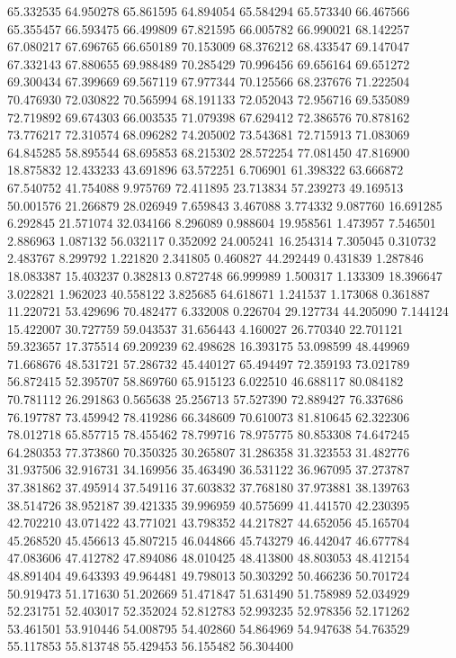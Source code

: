 65.332535
64.950278
65.861595
64.894054
65.584294
65.573340
66.467566
65.355457
66.593475
66.499809
67.821595
66.005782
66.990021
68.142257
67.080217
67.696765
66.650189
70.153009
68.376212
68.433547
69.147047
67.332143
67.880655
69.988489
70.285429
70.996456
69.656164
69.651272
69.300434
67.399669
69.567119
67.977344
70.125566
68.237676
71.222504
70.476930
72.030822
70.565994
68.191133
72.052043
72.956716
69.535089
72.719892
69.674303
66.003535
71.079398
67.629412
72.386576
70.878162
73.776217
72.310574
68.096282
74.205002
73.543681
72.715913
71.083069
64.845285
58.895544
68.695853
68.215302
28.572254
77.081450
47.816900
18.875832
12.433233
43.691896
63.572251
6.706901
61.398322
63.666872
67.540752
41.754088
9.975769
72.411895
23.713834
57.239273
49.169513
50.001576
21.266879
28.026949
7.659843
3.467088
3.774332
9.087760
16.691285
6.292845
21.571074
32.034166
8.296089
0.988604
19.958561
1.473957
7.546501
2.886963
1.087132
56.032117
0.352092
24.005241
16.254314
7.305045
0.310732
2.483767
8.299792
1.221820
2.341805
0.460827
44.292449
0.431839
1.287846
18.083387
15.403237
0.382813
0.872748
66.999989
1.500317
1.133309
18.396647
3.022821
1.962023
40.558122
3.825685
64.618671
1.241537
1.173068
0.361887
11.220721
53.429696
70.482477
6.332008
0.226704
29.127734
44.205090
7.144124
15.422007
30.727759
59.043537
31.656443
4.160027
26.770340
22.701121
59.323657
17.375514
69.209239
62.498628
16.393175
53.098599
48.449969
71.668676
48.531721
57.286732
45.440127
65.494497
72.359193
73.021789
56.872415
52.395707
58.869760
65.915123
6.022510
46.688117
80.084182
70.781112
26.291863
0.565638
25.256713
57.527390
72.889427
76.337686
76.197787
73.459942
78.419286
66.348609
70.610073
81.810645
62.322306
78.012718
65.857715
78.455462
78.799716
78.975775
80.853308
74.647245
64.280353
77.373860
70.350325
30.265807
31.286358
31.323553
31.482776
31.937506
32.916731
34.169956
35.463490
36.531122
36.967095
37.273787
37.381862
37.495914
37.549116
37.603832
37.768180
37.973881
38.139763
38.514726
38.952187
39.421335
39.996959
40.575699
41.441570
42.230395
42.702210
43.071422
43.771021
43.798352
44.217827
44.652056
45.165704
45.268520
45.456613
45.807215
46.044866
45.743279
46.442047
46.677784
47.083606
47.412782
47.894086
48.010425
48.413800
48.803053
48.412154
48.891404
49.643393
49.964481
49.798013
50.303292
50.466236
50.701724
50.919473
51.171630
51.202669
51.471847
51.631490
51.758989
52.034929
52.231751
52.403017
52.352024
52.812783
52.993235
52.978356
52.171262
53.461501
53.910446
54.008795
54.402860
54.864969
54.947638
54.763529
55.117853
55.813748
55.429453
56.155482
56.304400
